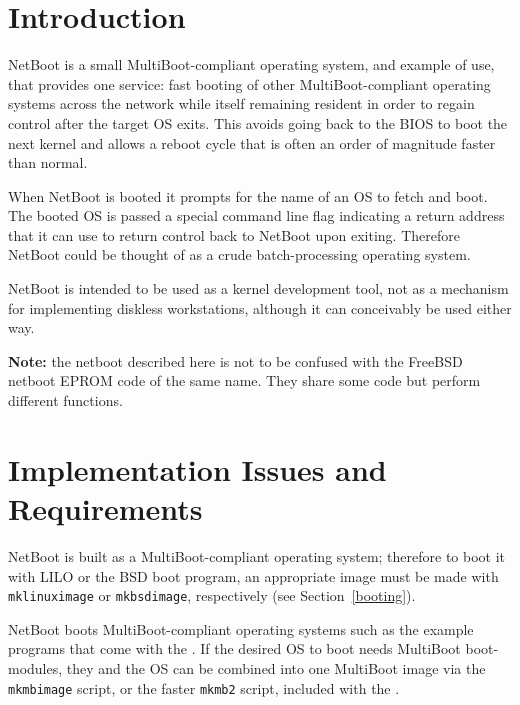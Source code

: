%
% 
%
\label{netboot}

\section{Introduction}

NetBoot is a small MultiBoot-compliant operating system,
and example of \oskit{} use, that provides one service:
fast booting of other MultiBoot-compliant operating systems
across the network while
itself remaining resident in order to regain control after
the target OS exits.   This avoids going back to the
BIOS to boot the next kernel and allows a reboot cycle that
is often an order of magnitude faster than normal.

When NetBoot is booted it prompts for the name of an OS
to fetch and boot.
The booted OS is passed a special command line flag indicating a
return address that it can use to return control back to NetBoot
upon exiting.
Therefore NetBoot could be thought of as a crude batch-processing
operating system.

NetBoot is intended to be used as a kernel development tool,
not as a mechanism for implementing diskless workstations,
although it can conceivably be used either way.

\textbf{Note:} the netboot described here is not to be
confused with the FreeBSD netboot EPROM code of the same name.
They share some code but perform different functions.

\section{Implementation Issues and Requirements}

NetBoot is built as a MultiBoot-compliant operating system;
therefore to boot it with LILO or the BSD boot program,
an appropriate image must be made with
\texttt{mklinuximage} or \texttt{mkbsdimage},
respectively (see Section~\ref{booting}).

NetBoot boots MultiBoot-compliant operating systems such
as the example programs that come with the \oskit{}.
If the desired OS to boot needs MultiBoot boot-modules,
they and the OS can be combined into one MultiBoot image via the
\texttt{mkmbimage} script, or the faster \texttt{mkmb2} script,
included with the \oskit{}.

